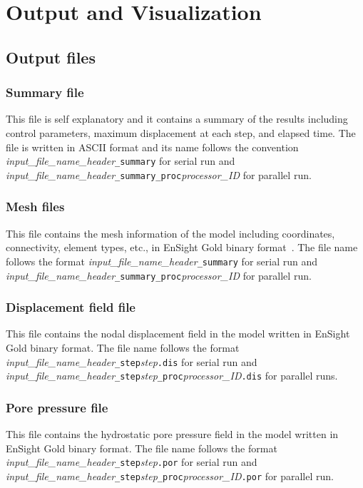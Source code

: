 \chapter{Output and Visualization}
\label{chap:out}
\section{Output files}

\subsection{Summary file}

This file is self explanatory and it contains a summary of the results including control parameters, maximum displacement at each step, and elapsed time. The file is written in ASCII format and its name follows the convention \emph{input\_file\_name\_header}\texttt{\_summary} for serial run and \emph{input\_file\_name\_header}\texttt{\_summary\_proc}\emph{processor\_ID} for parallel run.

\subsection{Mesh files}

This file contains the mesh information of the model including coordinates, connectivity, element types, etc., in EnSight Gold binary format~\citep[see][]{ensight2008}. The file name follows the format \emph{input\_file\_name\_header}\texttt{\_summary} for serial run and \emph{input\_file\_name\_header}\texttt{\_summary\_proc}\emph{processor\_ID} for parallel run.

\subsection{Displacement field file}

This file contains the nodal displacement field in the model written in EnSight Gold binary format. The file name follows the format \emph{input\_file\_name\_header}\texttt{\_step}\emph{step}\texttt{.dis} for serial run and \emph{input\_file\_name\_header}\texttt{\_step}\emph{step}\texttt{\_proc}\emph{processor\_ID}\texttt{.dis} for parallel runs.

\subsection{Pore pressure file}

This file contains the hydrostatic pore pressure field in the model written in EnSight Gold binary format. The file name follows the format \emph{input\_file\_name\_header}\texttt{\_step}\emph{step}\texttt{.por} for serial run and \emph{input\_file\_name\_header}\texttt{\_step}\emph{step}\texttt{\_proc}\emph{processor\_ID}\texttt{.por} for parallel run.

